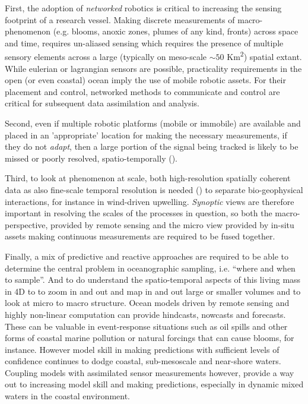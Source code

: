 First, the adoption of \emph{networked} robotics is critical to
increasing the sensing footprint of a research vessel. Making discrete
measurements of macro-phenomenon (e.g. blooms, anoxic zones, plumes of
any kind, fronts) across space and time, requires un-aliased sensing
which requires the presence of multiple sensory elements across a
large (typically on meso-scale $\sim 50$ Km\textsuperscript{2})
spatial extant. While eulerian or lagrangian sensors are possible,
practicality requirements in the open (or even coastal) ocean imply
the use of mobile robotic assets. For their placement and control,
networked methods to communicate and control are critical for
subsequent data assimilation and analysis.

Second, even if multiple robotic platforms (mobile or immobile) are
available and placed in an 'appropriate' location for making the
necessary measurements, if they do not \emph{adapt}, then a large
portion of the signal being tracked is likely to be missed or poorly
resolved, spatio-temporally ().

Third, to look at phenomenon at scale, both high-resolution spatially
coherent data as also fine-scale temporal resolution is needed
() to separate bio-geophysical interactions, for instance in
wind-driven upwelling. \emph{Synoptic} views are therefore important
in resolving the scales of the processes in question, so both the
macro- perspective, provided by remote sensing and the micro view
provided by in-situ assets making continuous measurements are required
to be fused together.

Finally, a mix of predictive and reactive approaches are required to
be able to determine the central problem in oceanographic sampling,
i.e. ``where and when to sample''. And to do understand the
spatio-temporal aspects of this living mass in 4D to to zoom in and
out and map in and out large or smaller volumes and to look at micro
to macro structure. Ocean models driven by remote sensing and highly
non-linear computation can provide hindcasts, nowcasts and
forecasts. These can be valuable in event-response situations such as
oil spills and other forms of coastal marine pollution or natural
forcings that can cause blooms, for instance. However model skill in
making predictions with sufficient levels of confidence continues to
dodge coastal, sub-mesoscale and near-shore waters. Coupling models
with assimilated sensor measurements however, provide a way out to
increasing model skill and making predictions, especially in dynamic
mixed waters in the coastal environment.

